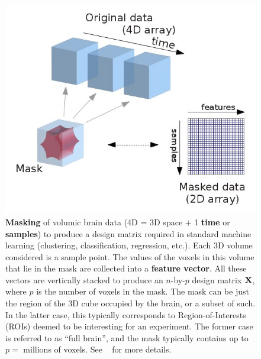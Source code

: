   \begin{figure}[!htb] 
  \includegraphics[width=1\linewidth]{figures/masking.jpg}
  \caption{\textbf{Masking} of volumic brain data (4D = 3D space + 1 \textbf{time} or \textbf{samples})
    to produce a design matrix required in standard machine learning (clustering, classification, regression, etc.). Each 3D volume considered is a sample point. The values of the voxels in this volume that lie in the mask are collected into a \textbf{feature vector}. All these vectors are vertically stacked to produce an $n$-by-$p$ design matrix $\mathbf{X}$, where $p$ is the number of voxels in the mask. The mask can be just the region of the 3D cube occupied by the brain, or a subset of such. In the latter case, this typically corresponds to Region-of-Interests (ROIs) deemed to be interesting for an experiment. The former case is referred to as ``full brain'', and the mask typically contains up to $p = $ millions of voxels. See ~\citep{abraham2014machine} for more details.}
  \label{fig:masking}
\end{figure}

